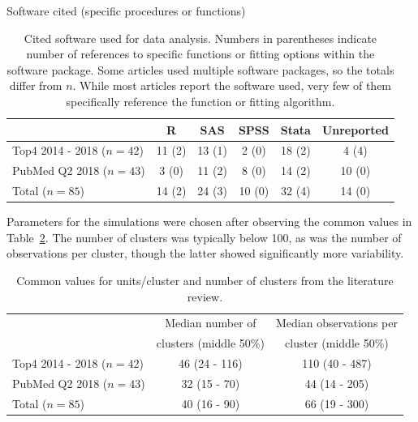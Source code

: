 \documentclass{article}
\begin{document}
\begin{flushleft}
\begin{table}[]
\centering
Software cited (specific procedures or functions)
 \begin{tabular}{ |l||c|c|c|c|c| } 
 \hline
      & R & SAS & SPSS & Stata & Unreported\\ 
     \hline
    Top4 2014 - 2018 ($n=42$) & 11 (2) & 13 (1) & 2 (0) & 18 (2) & 4 (4)  \\ 
    PubMed Q2 2018 ($n=43$) & 3 (0) & 11 (2) & 8 (0) & 14 (2) & 10 (0) \\ 
    \hline
    Total ($n=85$) & 14 (2) & 24 (3) & 10 (0) & 32 (4) & 14 (0) \\ 
\hline
 \end{tabular}
    \caption{Cited software used for data analysis. Numbers in parentheses indicate number of references to specific functions or fitting options within the software package. Some articles used multiple software packages, so the totals differ from $n$. While most articles report the software used, very few of them specifically reference the function or fitting algorithm.}
    \label{tab:lit_review}
\end{table}

Parameters for the simulations were chosen after observing the common values in Table~\ref{tab:lit_review_numbers}. The number of clusters was typically below 100, as was the number of observations per cluster, though the latter showed significantly more variability.

\begin{table}[]
\centering
 \begin{tabular}{ |l||c|c| } 
 \hline
      & Median number of & Median observations per \\ 
      & clusters (middle 50\%) & cluster (middle 50\%) \\ 
     \hline
    Top4 2014 - 2018 ($n=42$) & 46 (24 - 116) & 110 (40 - 487) \\ 
    PubMed Q2 2018 ($n=43$) & 32 (15 - 70) & 44 (14 - 205) \\ 
    \hline
    Total ($n=85$) & 40 (16 - 90) & 66 (19 - 300) \\
    \hline
 \end{tabular}
    \caption{Common values for units/cluster and number of clusters from the literature review.}
    \label{tab:lit_review_numbers}
\end{table}




\end{flushleft}
\end{document}

